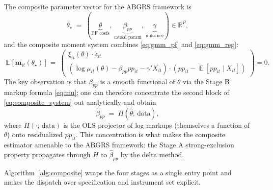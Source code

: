 \documentclass[11pt]{article}
\DeclareMathOperator{\E}{\mathbb{E}}
\begin{document}
The composite parameter vector for the ABGRS framework is
\begin{equation}\label{eq:theta_star}
\theta_\star \;=\; (\underbrace{\theta}_{\text{PF coefs}},\, \underbrace{\beta_{pp}}_{\text{causal param}},\, \underbrace{\gamma}_{\text{nuisance}}) \in \mathbb{R}^{P},
\end{equation}
and the composite moment system combines \eqref{eq:gmm_pf} and \eqref{eq:gmm_reg}:
\begin{equation}\label{eq:composite_system}
\E\bigl[\,\bm{m}_{it}(\theta_\star)\,\bigr] \;=\; \begin{pmatrix}
\xi_{it}(\theta)\cdot z_{it} \\[4pt]
(\log\mu_{it}(\theta) - \beta_{pp} pp_{it} - \gamma'X_{it})\cdot(pp_{it} - \E[pp_{it}\mid X_{it}])
\end{pmatrix} = 0.
\end{equation}
The key observation is that $\beta_{pp}$ is a smooth functional of $\theta$ via the Stage B markup formula \eqref{eq:mu}; one can therefore concentrate the second block of \eqref{eq:composite_system} out analytically and obtain
\begin{equation}\label{eq:beta_pp_concentrated}
\hat\beta_{pp} \;=\; H(\hat\theta;\,\text{data}),
\end{equation}
where $H(\cdot;\,\text{data})$ is the OLS projector of log markups (themselves a function of $\theta$) onto residualized $pp_{it}$. This concentration is what makes the composite estimator amenable to the ABGRS framework: the Stage A strong-exclusion property propagates through $H$ to $\hat\beta_{pp}$ by the delta method.

Algorithm~\ref{alg:composite} wraps the four stages as a single entry point and makes the dispatch over specification and instrument set explicit.
\end{document}
